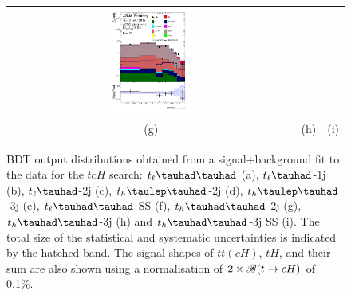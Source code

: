 \begin{figure}[H]
\begin{tabular}{@{}ccc@{}}
\includegraphics[width=0.29\textwidth]{figures/tcH_reg2mtau1b3jss.pdf}\\
(g) & (h)  & (i) \\
\end{tabular}
\caption{ BDT output distributions obtained from a signal+background fit to the data for the $tcH$ search: 
$t_{\ell}\thadhad$ (a), $t_{\ell}\tauhad$-1j (b),  $t_{\ell}\tauhad$-2j (c), $t_h\tlhad$-2j (d), $t_h\tlhad$-3j (e), $t_{\ell}\thadhad$-SS (f), $t_h\thadhad$-2j (g), $t_h\thadhad$-3j (h) and $t_h\thadhad$-3j SS (i). 
The total size of the statistical and systematic
uncertainties is indicated by the hatched band. The signal shapes of $tt(cH)$, $tH$, and their sum are also shown using a normalisation of $2 \times\mathscr{B}(t\to cH)$ of 0.1\%.
}
\label{fig:asimov_postfitbdtHc}
\end{figure}

